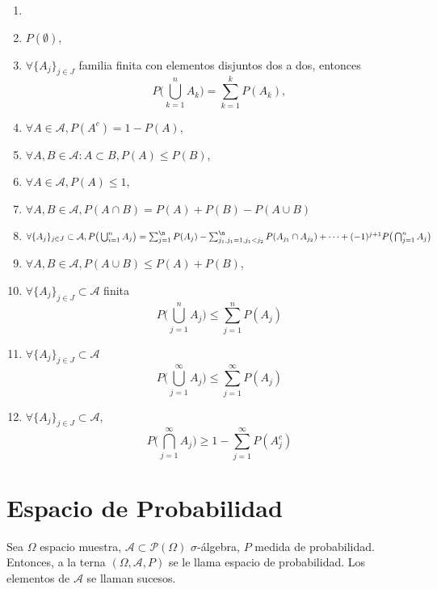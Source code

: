 \begin{prop}
  \begin{enumerate}[label=(\roman*)]
    \item []
    \item $P(\emptyset)$,
    \item $\forall \{ A_{j} \}_{j \in J}$ familia finita con elementos disjuntos dos a dos, entonces
      \[ 
        P \Big ( \bigcup_{k = 1}^{n} A_{k} \Big ) = \sum_{ k = 1 }^{k} P(A_{k}),
      \] 
    \item $\forall A \in \mathcal{A}, P(A^c) = 1 - P(A)$,
    \item $\forall A,B \in \mathcal{A}: A \subset B, P(A) \leq P(B)$,
    \item $\forall A \in \mathcal{A}, P(A) \leq 1$,
    \item $\forall A,B \in \mathcal{A}, P(A \cap B) = P(A) + P(B) - P(A \cup B)$
    \item $\forall \{ A_{j} \}_{j \in J} \subset \mathcal{A}, P \big (\bigcup_{i = 1}^{n} A_{j} \big) = \sum_{j = 1}^{\n} P(A_{j}) - \sum_{j_{1}, j_{1} = 1, j_{1} < j_{2}}^{\n} P(A_{j_{1}} \cap A_{j_{2}}) + \cdots + (-1)^{j+1} P \big ( \bigcap_{j = 1}^{n} A_{j} \big )$
    \item $\forall A, B \in \mathcal{A}, P(A \cup B) \leq P(A) + P(B)$,
    \item $\forall \{ A_{j} \}_{j \in J} \subset \mathcal{A}$ finita
      \[ 
        P \Big ( \bigcup_{j = 1}^{n} A_{j} \Big ) \leq \sum_{j = 1}^{n} P(A_{j})
      \] 
    \item $\forall \{ A_{j} \}_{j \in J} \subset \mathcal{A}$
      \[ 
        P \Big ( \bigcup_{j = 1}^{\infty} A_{j} \Big ) \leq \sum_{j = 1}^{\infty} P(A_{j})
      \] 
    \item $\forall \{ A_{j} \}_{j \in J} \subset \mathcal{A}$,
      \[ 
        P \Big ( \bigcap_{j = 1}^{\infty} A_{j} \Big ) \geq 1 - \sum_{j = 1}^{\infty} P(A^{c}_{j})
      \] 
  \end{enumerate}
\end{prop}

\section{Espacio de Probabilidad}

\begin{defn}
  Sea $\Omega$ espacio muestra, $\mathcal{A} \subset \mathcal{P}(\Omega)$ $\sigma$-álgebra, $P$ medida de probabilidad. Entonces, a la terna $(\Omega, \mathcal{A}, P)$ se le llama espacio de probabilidad. Los elementos de $\mathcal{A}$ se llaman sucesos.
\end{defn}

